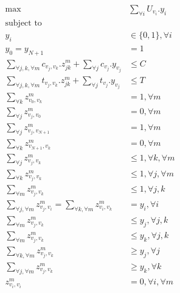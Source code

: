\begin{align}
		\label{eq:max}
	\max & \sum_{\forall i} U_{v_{i}} . y_{i} \\
	\text{subject to } & \nonumber \\
		\label{eq:y}
	y_{i} & \in \{ 0, 1 \}, \forall i \\
		\label{eq:sd}
	y_{0} = y_{{N+1}} & = 1 \\
		\label{eq:cost}
	\sum_{\forall j, k, \forall m} c_{v_{j},v_{k}} . z^m_{jk} + \sum_{\forall j} c_{v_j} . y_{v_j} & \leq C \\
		\label{eq:time}
	\sum_{\forall j, k, \forall m} t_{v_{j},v_{k}} . z^m_{jk} + \sum_{\forall j} t_{v_j} . y_{v_j} & \leq T \\
		\label{eq:sout}
	\sum_{\forall k} z^m_{v_{0},v_{k}} & = 1, \forall m \\
		\label{eq:sin}
	\sum_{\forall j} z^m_{v_{j},v_{0}} & = 0, \forall m \\
		\label{eq:din}
	\sum_{\forall j} z^m_{v_{j},v_{N+1}} & = 1, \forall m \\
		\label{eq:dout}
	\sum_{\forall k} z^m_{v_{N+1},v_{k}} & = 0, \forall m \\
		\label{eq:out}
	\sum_{\forall j} z^m_{v_{j},v_{k}} & \leq 1, \forall k, \forall m \\
		\label{eq:in}
	\sum_{\forall k} z^m_{v_{j},v_{k}} & \leq 1, \forall j, \forall m \\
		\label{eq:mode}
	\sum_{\forall m} z^m_{v_{j},v_{k}} & \leq 1, \forall j, k \\
		\label{eq:connectivity}
	\sum_{\forall j, \forall m} z^m_{v_{j},v_{i}} = \sum_{\forall k, \forall m} z^m_{v_{i},v_{k}} & = y_i, \forall i \\
		\label{eq:nodechosen1}
	\sum_{\forall m} z^m_{v_{j},v_{k}} & \leq y_j, \forall j,k \\
		\label{eq:nodechosen2}
	\sum_{\forall m} z^m_{v_{j},v_{k}} & \leq y_k, \forall j,k \\
		\label{eq:edgechosen1}
	\sum_{\forall k, \forall m} z^m_{v_{j},v_{k}} & \geq y_j, \forall j \\
		\label{eq:edgechosen2}
	\sum_{\forall j, \forall m} z^m_{v_{j},v_{k}} & \geq y_k, \forall k \\
		\label{eq:self}
	z^m_{v_{i},v_{i}} & = 0, \forall i, \forall m 
\end{align}


